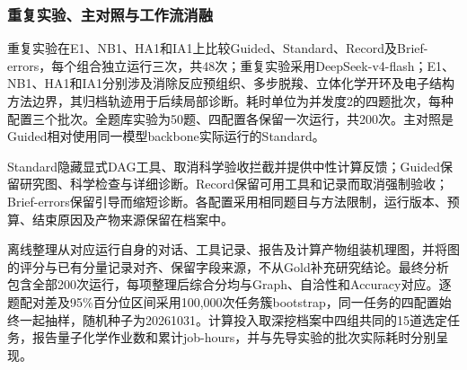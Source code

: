 \subsubsection{重复实验、主对照与工作流消融}

重复实验在E1、NB1、HA1和IA1上比较Guided、Standard、Record及Brief-errors，每个组合独立运行三次，共48次；重复实验采用DeepSeek-v4-flash；E1、NB1、HA1和IA1分别涉及消除反应预组织、多步脱羧、立体化学开环及电子结构方法边界，其归档轨迹用于后续局部诊断。耗时单位为并发度2的四题批次，每种配置三个批次。全题库实验为50题、四配置各保留一次运行，共200次。主对照是Guided相对使用同一模型backbone实际运行的Standard。



Standard隐藏显式DAG工具、取消科学验收拦截并提供中性计算反馈；Guided保留研究图、科学检查与详细诊断。Record保留可用工具和记录而取消强制验收；Brief-errors保留引导而缩短诊断。各配置采用相同题目与方法限制，运行版本、预算、结束原因及产物来源保留在档案中。



离线整理从对应运行自身的对话、工具记录、报告及计算产物组装机理图，并将图的评分与已有分量记录对齐、保留字段来源，不从Gold补充研究结论。最终分析包含全部200次运行，每项整理后综合分均与Graph、自洽性和Accuracy对应。逐题配对差及95\%百分位区间采用100,000次任务簇bootstrap，同一任务的四配置始终一起抽样，随机种子为20261031。计算投入取深挖档案中四组共同的15道选定任务，报告量子化学作业数和累计job-hours，并与先导实验的批次实际耗时分别呈现。

